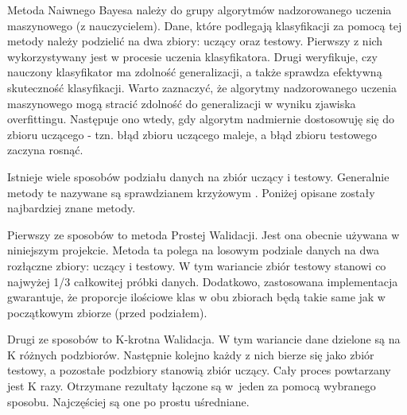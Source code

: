 Metoda Naiwnego Bayesa należy do grupy algorytmów nadzorowanego uczenia maszynowego (z nauczycielem). Dane, które podlegają klasyfikacji za pomocą tej metody należy podzielić na dwa zbiory: uczący oraz testowy. Pierwszy z nich wykorzystywany jest w procesie uczenia klasyfikatora. Drugi weryfikuje, czy nauczony klasyfikator ma zdolność generalizacji, a także sprawdza efektywną skuteczność klasyfikacji. Warto zaznaczyć, że algorytmy nadzorowanego uczenia maszynowego mogą stracić zdolność do generalizacji w wyniku zjawiska overfittingu. Następuje ono wtedy, gdy algorytm nadmiernie dostosowuję się do zbioru uczącego - tzn. błąd zbioru uczącego maleje, a błąd zbioru testowego zaczyna rosnąć.

Istnieje wiele sposobów podziału danych na zbiór uczący i testowy. Generalnie metody te nazywane są sprawdzianem krzyżowym \cite{bibSprKrzyzowy}. Poniżej opisane zostały najbardziej znane metody.

Pierwszy ze sposobów to metoda Prostej Walidacji. Jest ona obecnie używana w niniejszym projekcie. Metoda ta  polega na losowym podziale danych na dwa rozłączne zbiory: uczący i testowy. W tym wariancie zbiór testowy  stanowi co najwyżej 1/3 całkowitej próbki danych. Dodatkowo, zastosowana implementacja gwarantuje, że proporcje  ilościowe klas w obu zbiorach będą takie same jak w początkowym zbiorze (przed podziałem).

Drugi ze sposobów to K-krotna Walidacja. W tym wariancie dane dzielone są na K różnych podzbiorów. Następnie kolejno każdy z nich bierze się jako zbiór testowy, a pozostałe podzbiory stanowią zbiór uczący. Cały proces powtarzany jest K razy. Otrzymane rezultaty łączone są w~jeden za pomocą wybranego sposobu. Najczęściej są one po prostu uśredniane.
